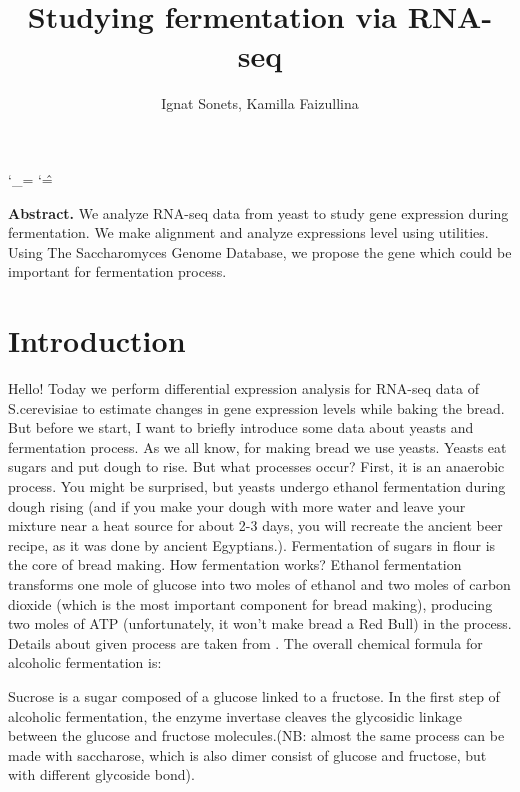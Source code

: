 \documentclass{article}
\title{Studying  fermentation via RNA-seq  }
\author{ Ignat Sonets, Kamilla Faizullina}
\date{\empty}
\begin{document}
	
		\catcode`\_=\active
	\catcode`\^=\active
	
\maketitle
 
\textbf{Abstract.}  We analyze RNA-seq data from yeast  to study gene expression   during fermentation. We make alignment and analyze expressions level using utilities. Using The Saccharomyces Genome Database, we propose the gene which could be important for fermentation process. 
 
\section{Introduction}
 
 Hello! Today we perform differential expression analysis for RNA-seq data of S.cerevisiae to estimate changes in gene expression levels while baking the bread. But before we start, I want to briefly introduce some data about yeasts and fermentation process.
 As we all  know, for making bread we use yeasts. Yeasts eat sugars and put dough to rise. But what processes occur? First, it is an anaerobic process. You might be surprised, but yeasts undergo ethanol fermentation during dough rising (and if you make your dough with more water and leave your mixture near a heat source for about 2-3 days, you will recreate the ancient beer recipe, as it was done by ancient Egyptians.). Fermentation of sugars in flour is the core of bread making. How fermentation works? Ethanol fermentation transforms one mole of glucose into two moles of ethanol and two moles of carbon dioxide (which is the most important component for bread making), producing two moles of ATP (unfortunately, it won't make bread a Red Bull) in the process. 
 Details about given process are taken from \cite{1}.
 The overall chemical formula for alcoholic fermentation is:
 
 
 Sucrose is a sugar composed of a glucose linked to a fructose. In the first step of alcoholic fermentation, the enzyme invertase cleaves the glycosidic linkage between the glucose and fructose molecules.(NB: almost the same process can be made with saccharose, which is also dimer consist of glucose and fructose, but with different glycoside bond).
 
 
\end{document}
